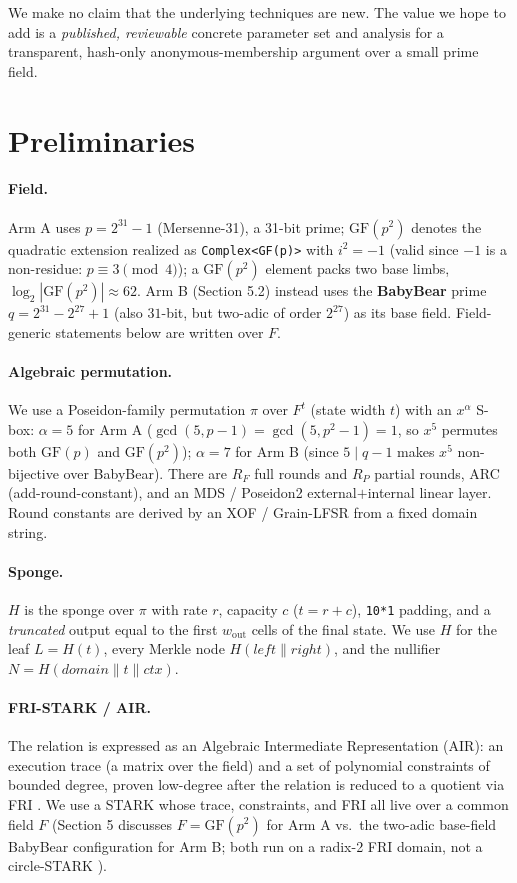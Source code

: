 \documentclass[11pt]{article}
\newcommand{\GF}[1]{\mathrm{GF}(#1)}
\newcommand{\cat}{\mathbin{\|}}          %
\newcommand{\wout}{w_{\mathrm{out}}}
\theoremstyle{plain}
\theoremstyle{definition}
\begin{document}
We make no claim that the underlying techniques are new. The value we hope to add is a \emph{published,
reviewable} concrete parameter set and analysis for a transparent, hash-only anonymous-membership
argument over a small prime field.

\section{Preliminaries}

\paragraph{Field.} Arm A uses $p = 2^{31} - 1$ (Mersenne-31), a 31-bit prime; $\GF{p^2}$ denotes the
quadratic extension realized as \texttt{Complex<GF(p)>} with $i^2 = -1$ (valid since $-1$ is a
non-residue: $p \equiv 3 \pmod 4$); a $\GF{p^2}$ element packs two base limbs, $\log_2|\GF{p^2}|
\approx 62$. Arm B (Section 5.2) instead uses the \textbf{BabyBear} prime $q = 2^{31} - 2^{27} + 1$
(also $31$-bit, but two-adic of order $2^{27}$) as its base field. Field-generic statements below are
written over $F$.

\paragraph{Algebraic permutation.} We use a Poseidon-family permutation $\pi$ over $F^t$ (state width
$t$) with an $x^\alpha$ S-box: $\alpha = 5$ for Arm A ($\gcd(5, p-1) = \gcd(5, p^2-1) = 1$, so $x^5$
permutes both $\GF{p}$ and $\GF{p^2}$); $\alpha = 7$ for Arm B (since $5 \mid q-1$ makes $x^5$
non-bijective over BabyBear). There are $R_F$ full rounds and $R_P$ partial rounds, ARC
(add-round-constant), and an MDS / Poseidon2 external$+$internal linear layer. Round constants are
derived by an XOF / Grain-LFSR from a fixed domain string.

\paragraph{Sponge.} $H$ is the sponge \cite{BDPV07} over $\pi$ with rate $r$, capacity $c$
($t = r + c$), \texttt{10*1} padding, and a \emph{truncated} output equal to the first $\wout$ cells
of the final state. We use $H$ for the leaf $L = H(t)$, every Merkle node
$H(\mathit{left} \cat \mathit{right})$, and the nullifier $N = H(\mathit{domain} \cat t \cat
\mathit{ctx})$.

\paragraph{FRI-STARK / AIR.} The relation is expressed as an Algebraic Intermediate Representation
(AIR): an execution trace (a matrix over the field) and a set of polynomial constraints of bounded
degree, proven low-degree after the relation is reduced to a quotient via FRI \cite{BBHR18}. We use a
STARK whose trace, constraints, and FRI all live over a common field $F$ (Section 5 discusses
$F = \GF{p^2}$ for Arm A vs.\ the two-adic base-field BabyBear configuration for Arm B; both run on a
radix-2 FRI domain, not a circle-STARK \cite{HLP24}).
\end{document}
